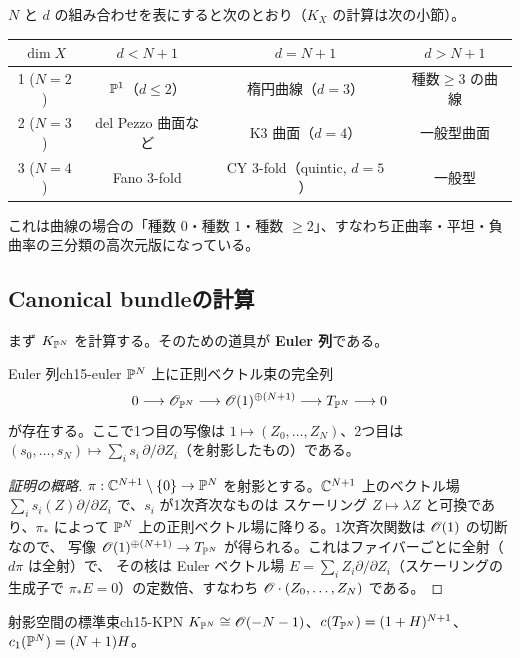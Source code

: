 $N$ と $d$ の組み合わせを表にすると次のとおり（$K_X$ の計算は次の小節）。
\begin{center}
\small
\begin{tabular}{c|c|c|c}
$\dim X$ & $d< N+1$ & $d = N+1$ & $d>N+1$ \\ \hline
1 ($N=2$) & $\mathbb{P}^1$（$d\le 2$）& 楕円曲線（$d=3$）& 種数$\ge3$ の曲線 \\
2 ($N=3$) & del Pezzo 曲面など & K3 曲面（$d=4$）& 一般型曲面 \\
3 ($N=4$) & Fano 3-fold & CY 3-fold（quintic, $d=5$）& 一般型 \\
\end{tabular}
\end{center}
これは曲線の場合の「種数 $0$・種数 $1$・種数 $\ge2$」、すなわち正曲率・平坦・負曲率の三分類の高次元版になっている。

\subsection{Canonical bundleの計算}

まず $K_{\mathbb{P}^N}$ を計算する。そのための道具が \textbf{Euler 列}である。

\begin{mylem}{Euler 列}{ch15-euler}
$\mathbb{P}^N$ 上に正則ベクトル束の完全列
\[
0\longrightarrow\mathscr{O}_{\mathbb{P}^N}\longrightarrow\mathscr{O}(1)^{\oplus(N+1)}\longrightarrow T_{\mathbb{P}^N}\longrightarrow 0
\]
が存在する。ここで1つ目の写像は $1\mapsto(Z_0,\dots,Z_N)$、2つ目は $(s_0,\dots,s_N)\mapsto\sum_i s_i\,\partial/\partial Z_i$（を射影したもの）である。
\end{mylem}

\begin{proof}[証明の概略]
$\pi:\mathbb{C}^{N+1}\setminus\{0\}\to\mathbb{P}^N$ を射影とする。$\mathbb{C}^{N+1}$ 上のベクトル場 $\sum_i s_i(Z)\partial/\partial Z_i$ で、$s_i$ が1次斉次なものは
スケーリング $Z\mapsto\lambda Z$ と可換であり、$\pi_*$ によって $\mathbb{P}^N$ 上の正則ベクトル場に降りる。$1$次斉次関数は $\mathscr{O}(1)$ の切断なので、
写像 $\mathscr{O}(1)^{\oplus(N+1)}\to T_{\mathbb{P}^N}$ が得られる。これはファイバーごとに全射（$d\pi$ は全射）で、
その核は Euler ベクトル場 $E = \sum_iZ_i\partial/\partial Z_i$（スケーリングの生成子で $\pi_*E = 0$）の定数倍、すなわち $\mathscr{O}\cdot(Z_0,\dots,Z_N)$ である。
\end{proof}

\begin{mythm}{射影空間の標準束}{ch15-KPN}
$K_{\mathbb{P}^N}\cong\mathscr{O}(-N-1)$、$c(T_{\mathbb{P}^N}) = (1+H)^{N+1}$、$c_1(\mathbb{P}^N) = (N+1)H$。
\end{mythm}

